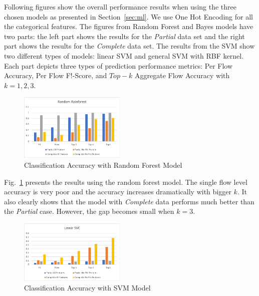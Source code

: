 Following figures show the overall performance results when using the three chosen models as presented in Section~\ref{sec:ml}. We use One Hot Encoding for all the categorical features. 
The figures from Random Forest and Bayes models have two parts: the left part shows the results for the {\it Partial} data set and the right part shows the results for the {\it Complete} data set. 
The results from the SVM show two different types of models: linear SVM and general SVM with RBF kernel. Each part depicts three types of prediction performance metrics: Per Flow Accuracy, 
Per Flow F!-Score, and $Top-k$ Aggregate Flow Accuracy with $k=1,2,3$.

\begin{figure}[!ht]
\begin{center}
\includegraphics[width=0.45\textwidth]{./figure/rf-accuracy}
\end{center}
\vspace{-0.05in}
\caption{Classification Accuracy with Random Forest Model}
\vspace{-0.05in}
\label{fig:dt}
\end{figure}

Fig.~\ref{fig:dt} presents the results using the random forest model. The single flow level accuracy is very poor and the accuracy increases dramatically with bigger $k$. It also clearly shows that the model with {\it Complete} data performs much better than the {\it Partial} case. However, the gap becomes small when $k=3$. 

\begin{figure}[!ht]
\begin{center}
\includegraphics[width=0.45\textwidth]{./figure/svc-accuracy}
\end{center}
\vspace{-0.05in}
\caption{Classification Accuracy with SVM Model}
\vspace{-0.05in}
\label{fig:svm}
\end{figure}

